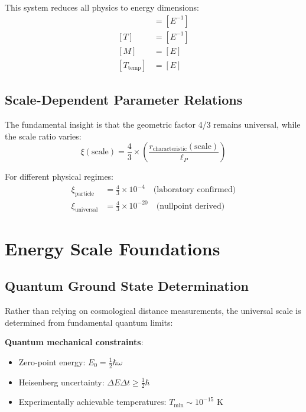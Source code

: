 \documentclass[12pt,a4paper]{article}
\begin{document}
	This system reduces all physics to energy dimensions:
	\begin{align}
		[L] &= [E^{-1}] \\
		[T] &= [E^{-1}] \\
		[M] &= [E] \\
		[T_{\text{temp}}] &= [E]
	\end{align}
	
	\subsection{Scale-Dependent Parameter Relations}
	\label{subsec:scale_dependent}
	
	The fundamental insight is that the geometric factor 4/3 remains universal, while the scale ratio varies:
	\begin{equation}
		\xi(\text{scale}) = \frac{4}{3} \times \left(\frac{r_{\text{characteristic}}(\text{scale})}{\ell_P}\right)
	\end{equation}
	
	For different physical regimes:
	\begin{align}
		\xi_{\text{particle}} &= \frac{4}{3} \times 10^{-4} \quad \text{(laboratory confirmed)} \\
		\xi_{\text{universal}} &= \frac{4}{3} \times 10^{-20} \quad \text{(nullpoint derived)}
	\end{align}
	
	\section{Energy Scale Foundations}
	\label{sec:energy_foundations}
	
	\subsection{Quantum Ground State Determination}
	\label{subsec:quantum_ground}
	
	Rather than relying on cosmological distance measurements, the universal scale is determined from fundamental quantum limits:
	
	\textbf{Quantum mechanical constraints}:
	\begin{itemize}
		\item Zero-point energy: $E_0 = \frac{1}{2}\hbar\omega$
		\item Heisenberg uncertainty: $\Delta E \Delta t \geq \frac{1}{2}\hbar$
		\item Experimentally achievable temperatures: $T_{\min} \sim 10^{-15}$ K
	\end{itemize}
	
\end{document}

